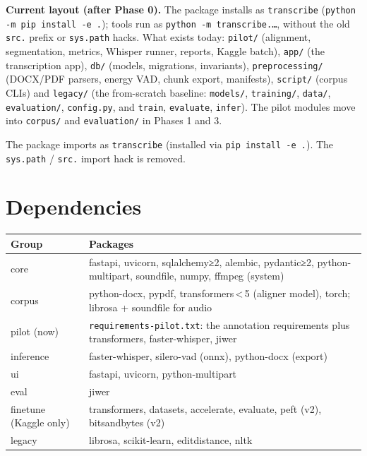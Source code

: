 \documentclass[11pt]{article}
\begin{document}
\textbf{Current layout (after Phase 0).} The package installs as \texttt{transcribe} (\texttt{python -m pip install -e .}); tools run as \texttt{python -m transcribe.\ldots}, without the old \texttt{src.} prefix or \texttt{sys.path} hacks. What exists today: \texttt{pilot/} (alignment, segmentation, metrics, Whisper runner, reports, Kaggle batch), \texttt{app/} (the transcription app), \texttt{db/} (models, migrations, invariants), \texttt{preprocessing/} (DOCX/PDF parsers, energy VAD, chunk export, manifests), \texttt{script/} (corpus CLIs) and \texttt{legacy/} (the from-scratch baseline: \texttt{models/}, \texttt{training/}, \texttt{data/}, \texttt{evaluation/}, \texttt{config.py}, and \texttt{train}, \texttt{evaluate}, \texttt{infer}). The pilot modules move into \texttt{corpus/} and \texttt{evaluation/} in Phases 1 and 3.

The package imports as \texttt{transcribe} (installed via \texttt{pip install -\allowbreak{}e .\allowbreak{}}). The \texttt{sys.\allowbreak{}path} / \texttt{src.\allowbreak{}} import hack is removed.

\hypertarget{dependencies}{%
\section{Dependencies}\label{dependencies}}

\begin{longtable}[]{@{}>{\raggedright\arraybackslash}p{}>{\raggedright\arraybackslash}p{}@{}}
\toprule\noalign{}
Group & Packages \\
\midrule\noalign{}
\endhead
\bottomrule\noalign{}
\endlastfoot
core & fastapi, uvicorn, sqlalchemy≥2, alembic, pydantic≥2, python-multipart, soundfile, numpy, ffmpeg (system) \\
corpus & python-docx, pypdf, transformers\,<\,5 (aligner model), torch; librosa + soundfile for audio \\
pilot (now) & \texttt{requirements-\allowbreak{}pilot.\allowbreak{}txt}: the annotation requirements plus transformers, faster-whisper, jiwer \\
inference & faster-whisper, silero-vad (onnx), python-docx (export) \\
ui & fastapi, uvicorn, python-multipart \\
eval & jiwer \\
finetune (Kaggle only) & transformers, datasets, accelerate, evaluate, peft (v2), bitsandbytes (v2) \\
legacy & librosa, scikit-learn, editdistance, nltk \\
\end{longtable}
\end{document}
